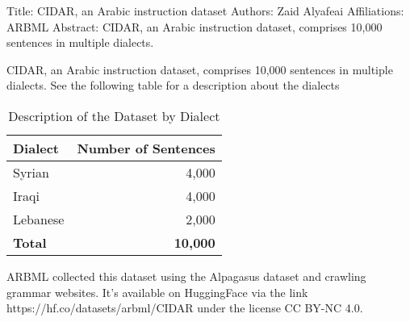 Title: CIDAR, an Arabic instruction dataset
Authors: Zaid Alyafeai
Affiliations: ARBML
Abstract: CIDAR, an Arabic instruction dataset, comprises 10,000 sentences in multiple dialects.

CIDAR, an Arabic instruction dataset, comprises 10,000 sentences in multiple dialects. See the following table for 
a description about the dialects
\begin{table}[ht]
    \centering
    \begin{tabular}{lr}
    \toprule
    \textbf{Dialect}   & \textbf{Number of Sentences} \\
    \midrule
    Syrian     & 4,000  \\
    Iraqi      & 4,000  \\
    Lebanese   & 2,000  \\
    \midrule
    \textbf{Total} & \textbf{10,000} \\
    \bottomrule
    \end{tabular}
    \caption{Description of the Dataset by Dialect}
    \label{tab:dataset_description}
    \end{table}

ARBML collected this dataset using the Alpagasus dataset and crawling grammar websites. 
It’s available on HuggingFace via the link https://hf.co/datasets/arbml/CIDAR under the license CC BY-NC 4.0.